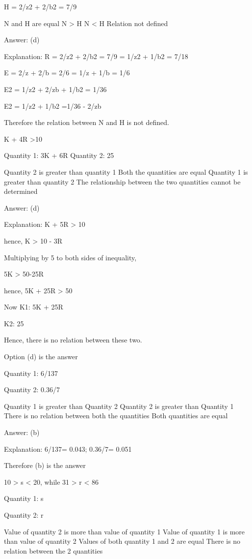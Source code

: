     H = 2/z2 + 2/b2 = 7/9

        N and H are equal
        N > H
        N < H
        Relation not defined

    Answer: (d)

    Explanation: R = 2/z2 + 2/b2 = 7/9 = 1/z2 + 1/b2 = 7/18

    E = 2/z + 2/b = 2/6 = 1/z + 1/b = 1/6

    E2 = 1/z2 + 2/zb + 1/b2 = 1/36

    E2 = 1/z2 + 1/b2 =1/36 - 2/zb

    Therefore the relation between N and H is not defined.

    K + 4R >10

    Quantity 1: 3K + 6R Quantity 2: 25

        Quantity 2 is greater than quantity 1
        Both the quantities are equal
        Quantity 1 is greater than quantity 2
        The relationship between the two quantities cannot be determined

    Answer: (d)

    Explanation:  K + 5R > 10

    hence, K > 10 - 3R

    Multiplying by 5 to both sides of inequality,

    5K > 50-25R

    hence, 5K + 25R > 50

    Now K1: 5K + 25R

    K2: 25

    Hence, there is no relation between these two.

    Option (d) is the answer

    Quantity 1: 6/137

    Quantity 2: 0.36/7

        Quantity 1 is greater than Quantity 2
        Quantity 2 is greater than Quantity 1
        There is no relation between both the quantities
        Both quantities are equal

    Answer: (b)

    Explanation: 6/137= 0.043; 0.36/7= 0.051

    Therefore (b) is the answer

    10 > s < 20, while 31 > r < 86

    Quantity 1: s

    Quantity 2: r

        Value of quantity 2 is more than value of quantity 1
        Value of quantity 1 is more than value of quantity 2
        Values of both quantity 1 and 2 are equal
        There is no relation between the 2 quantities

